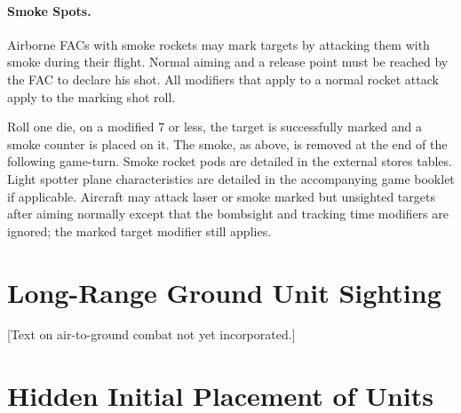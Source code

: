 \begin{advancedrules}
\paragraph{Smoke Spots.} Airborne FACs with smoke rockets may mark targets by attacking them with smoke during their flight. Normal aiming and a release point must be reached by the FAC to declare his shot. All modifiers that apply to a normal rocket attack apply to the marking shot roll.

Roll one die, on a modified 7 or less, the target is successfully marked and a smoke counter is placed on it. The smoke, as above, is removed at the end of the following game-turn. Smoke rocket pods are detailed in the external stores tables. Light spotter plane characteristics are detailed in the accompanying game booklet if applicable. Aircraft may attack laser or smoke marked but unsighted targets after aiming normally except that the bombsight and tracking time modifiers are ignored; the marked target modifier still applies.

\fi
\section{Long-Range Ground Unit Sighting}

[Text on air-to-ground combat not yet incorporated.]

\iffalse
Aircraft with observers on board (scout helos, some FAC aircraft and two seat jets or trainers opting to carry an observer) may double the distance at which ground units may be sighted and identified (binoculars or other optics in use).  Identification is as per Rule 11.5 except treat each two hexes or four altitude levels as one hex of range.

\paragraph{V.A.S. or TV/IR Optics.} Aircraft equipped with VAS or TV/IR Optics technology or pods, may sight and identify ground units and targets out to triple the normal range if sighting into arcs into which the VAS or TV/IR optics can see. In this case treat each 3 hexes or six altitude levels as one hex of range.

Also, aircraft with laser designators type B and C, and having TV/IR optics capability, may do long range sighting and identification in the same arcs as the designators are capable of designating into.
\fi

\section{Hidden Initial Placement of Units}


\end{advancedrules}
